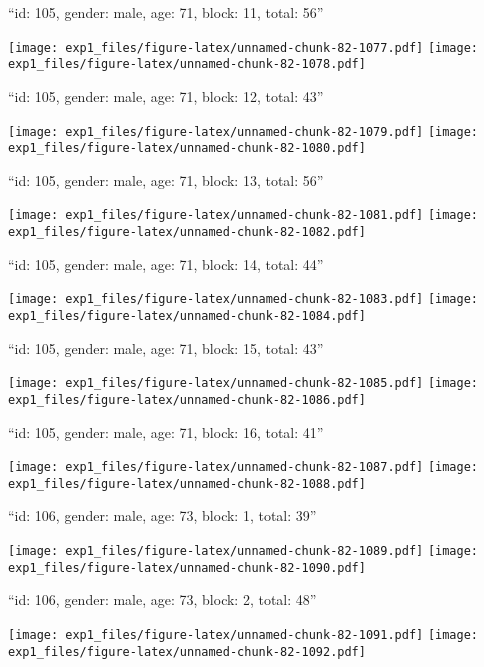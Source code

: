 \documentclass[11pt,,]{article}
\begin{document}
\newpage
[1] 

``id: 105, gender: male, age: 71, block: 11, total: 56''

\texttt{[image: exp1\_files/figure-latex/unnamed-chunk-82-1077.pdf]}
\texttt{[image: exp1\_files/figure-latex/unnamed-chunk-82-1078.pdf]}

\newpage
[1] 

``id: 105, gender: male, age: 71, block: 12, total: 43''

\texttt{[image: exp1\_files/figure-latex/unnamed-chunk-82-1079.pdf]}
\texttt{[image: exp1\_files/figure-latex/unnamed-chunk-82-1080.pdf]}

\newpage
[1] 

``id: 105, gender: male, age: 71, block: 13, total: 56''

\texttt{[image: exp1\_files/figure-latex/unnamed-chunk-82-1081.pdf]}
\texttt{[image: exp1\_files/figure-latex/unnamed-chunk-82-1082.pdf]}

\newpage
[1] 

``id: 105, gender: male, age: 71, block: 14, total: 44''

\texttt{[image: exp1\_files/figure-latex/unnamed-chunk-82-1083.pdf]}
\texttt{[image: exp1\_files/figure-latex/unnamed-chunk-82-1084.pdf]}

\newpage
[1] 

``id: 105, gender: male, age: 71, block: 15, total: 43''

\texttt{[image: exp1\_files/figure-latex/unnamed-chunk-82-1085.pdf]}
\texttt{[image: exp1\_files/figure-latex/unnamed-chunk-82-1086.pdf]}

\newpage
[1] 

``id: 105, gender: male, age: 71, block: 16, total: 41''

\texttt{[image: exp1\_files/figure-latex/unnamed-chunk-82-1087.pdf]}
\texttt{[image: exp1\_files/figure-latex/unnamed-chunk-82-1088.pdf]}

\newpage
[1] 

``id: 106, gender: male, age: 73, block: 1, total: 39''

\texttt{[image: exp1\_files/figure-latex/unnamed-chunk-82-1089.pdf]}
\texttt{[image: exp1\_files/figure-latex/unnamed-chunk-82-1090.pdf]}

\newpage
[1] 

``id: 106, gender: male, age: 73, block: 2, total: 48''

\texttt{[image: exp1\_files/figure-latex/unnamed-chunk-82-1091.pdf]}
\texttt{[image: exp1\_files/figure-latex/unnamed-chunk-82-1092.pdf]}
\end{document}
